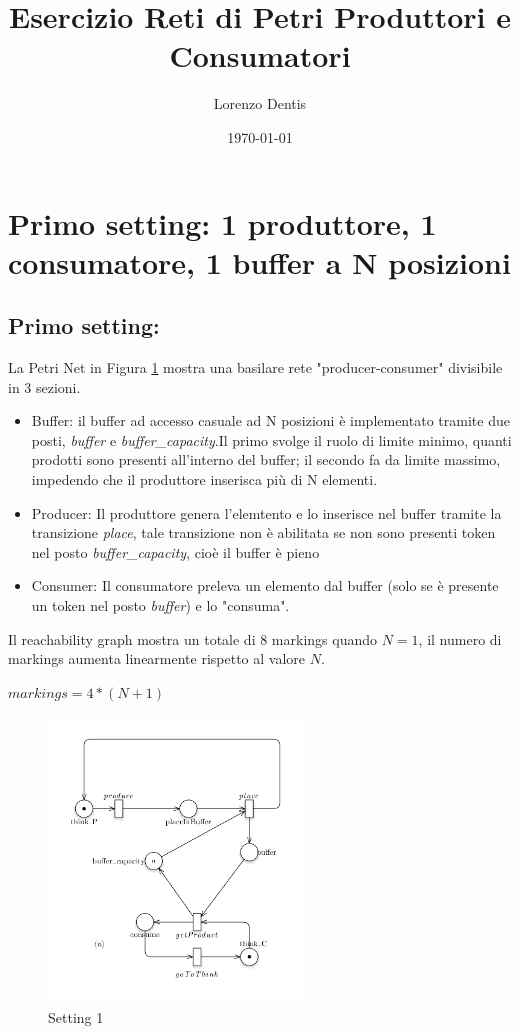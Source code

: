 \documentclass{article}
\begin{document}
\title{Esercizio Reti di Petri Produttori e Consumatori}
\author{Lorenzo Dentis}

\date{\today}

\maketitle

\section{Primo setting: 1 produttore, 1 consumatore, 1 buffer a N posizioni}\label{SEC:primo}
\subsection{Primo setting:}
La Petri Net in Figura \ref{FIG:setting1} mostra una basilare rete "producer-consumer" divisibile in 3 sezioni.
\begin{itemize}
	\item Buffer: il buffer ad accesso casuale ad N posizioni è implementato tramite due posti, \emph{buffer} e \emph{buffer\_capacity}.Il primo svolge il ruolo di limite minimo, quanti prodotti sono presenti all'interno del buffer; il secondo fa da limite massimo, impedendo che il produttore inserisca più di N elementi.
	\item Producer: Il produttore genera l'elemtento e lo inserisce nel buffer tramite la transizione \emph{place}, tale transizione non è abilitata se non sono presenti token nel posto \emph{buffer\_capacity}, cioè il buffer è pieno
	\item Consumer: Il consumatore preleva un elemento dal buffer (solo se è presente un token nel posto \emph{buffer}) e lo "consuma".
\end{itemize}
Il reachability graph mostra un totale di 8 markings quando $N =1$, il numero di markings aumenta linearmente rispetto al valore $N$.\begin{center}$markings = 4*(N + 1)$\end{center}
\begin{figure}[!ht]
\centering
\includegraphics[width=0.6\textwidth]{./Esercizio2_img/setting1.png}
\caption{Setting 1} \label{FIG:setting1}
\end{figure}
\newpage
\end{document}
